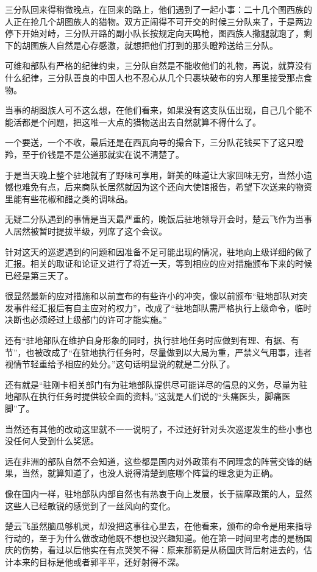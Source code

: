 三分队回来得稍微晚点，在回来的路上，他们遇到了一起小事：二十几个图西族的人正在抢几个胡图族人的猎物。双方正闹得不可开交的时候三分队来了，于是两边停下开始对峙，三分队开路的副小队长按规定向天鸣枪，图西族人撒腿就跑了，剩下的胡图族人自然是心存感激，就想把他们打到的那头瞪羚送给三分队。

可维和部队有严格的纪律约束，三分队自然是不能收他们的礼物，再说，就算没有什么纪律，三分队善良的中国人也不忍心从几个只裹块破布的穷人那里接受那点食物。

当事的胡图族人可不这么想，在他们看来，如果没有这支队伍出现，自己几个能不能活都是个问题，把这唯一大点的猎物送出去自然就算不得什么了。

一个要送，一个不收，最后还是在西瓦向导的撮合下，三分队花钱买下了这只瞪羚，至于价钱是不是公道那就实在说不清楚了。

于是当天晚上整个驻地就有了野味可享用，鲜美的味道让大家回味无穷，当然小遗憾也难免有点，后来商队长居然就因为这个还向大使馆报告，希望下次送来的物资里能有些花椒和醋之类的调味品。

无疑二分队遇到的事情是当天最严重的，晚饭后驻地领导开会时，楚云飞作为当事人居然被暂时提拔半级，列席了这个会议。

针对这天的巡逻遇到的问题和因准备不足可能出现的情况，驻地向上级详细的做了汇报。相关的取证和论证又进行了将近一天，等到相应的应对措施颁布下来的时候已经是第三天了。

很显然最新的应对措施和以前宣布的有些许小的冲突，像以前颁布“驻地部队对突发事件经汇报后有自主应对的权力”，改成了“驻地部队需严格执行上级命令，临时决断也必须经过上级部门的许可才能实施。”

还有“驻地部队在维护自身形象的同时，执行驻地任务时应做到有理、有据、有节”，也被改成了“在驻地执行任务时，尽量做到以大局为重，严禁义气用事，违者视情节轻重给予相应的处分。”这句话明显说的就是二分队了。

还有就是“驻刚卡相关部门有为驻地部队提供尽可能详尽的信息的义务，尽量为驻地部队在执行任务时提供较全面的资料。”这就是人们说的“头痛医头，脚痛医脚”了。

当然还有其他的改动这里就不一一说明了，不过还好针对头次巡逻发生的些小事也没任何人受到什么奖惩。

远在非洲的部队自然不会知道，这些都是国内对外政策有不同理念的阵营交锋的结果，当然，就算知道了，也没人说得清楚到底哪个阵营的理念更为正确。

像在国内一样，驻地部队内部自然也有热衷于向上发展，长于揣摩政策的人，显然这些人已经敏锐的感觉到了一丝风向的变化。

楚云飞虽然脑瓜够机灵，却没把这事往心里去，在他看来，颁布的命令是用来指导行动的，至于为什么做改动他既不想也没兴趣知道。他在第一时间里考虑的是杨国庆的伤势，看过以后他实在有点哭笑不得：原来那箭是从杨国庆背后射进去的，估计本来的目标是他或者郭平平，还好射得不深。

